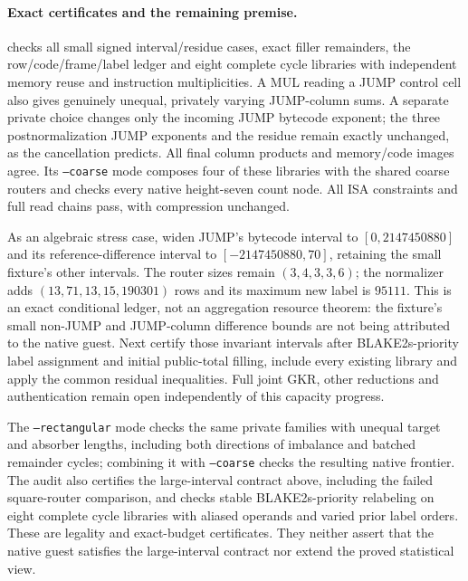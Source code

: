 \paragraph{Exact certificates and the remaining premise.}  checks all small signed interval/residue cases, exact filler remainders, the row/code/frame/label ledger and eight complete cycle libraries with independent memory reuse and instruction multiplicities. A MUL reading a JUMP control cell also gives genuinely unequal, privately varying JUMP-column sums. A separate private choice changes only the incoming JUMP bytecode exponent; the three postnormalization JUMP exponents and the residue remain exactly unchanged, as the cancellation predicts. All final column products and memory/code images agree. Its \texttt{--coarse} mode composes four of these libraries with the shared coarse routers and checks every native height-seven count node. All ISA constraints and full read chains pass, with compression unchanged.

As an algebraic stress case, widen JUMP's bytecode interval to $[0,2147450880]$ and its reference-difference interval to $[-2147450880,70]$, retaining the small fixture's other intervals. The router sizes remain $(3,4,3,3,6)$; the normalizer adds $(13,71,13,15,190301)$ rows and its maximum new label is $95111$. This is an exact conditional ledger, not an aggregation resource theorem: the fixture's small non-JUMP and JUMP-column difference bounds are not being attributed to the native guest. Next certify those invariant intervals after BLAKE2s-priority label assignment and initial public-total filling, include every existing library and apply the common residual inequalities. Full joint GKR, other reductions and authentication remain open independently of this capacity progress.

The \texttt{--rectangular} mode checks the same private families with unequal target and absorber lengths, including both directions of imbalance and batched remainder cycles; combining it with \texttt{--coarse} checks the resulting native frontier. The audit also certifies the large-interval contract above, including the failed square-router comparison, and checks stable BLAKE2s-priority relabeling on eight complete cycle libraries with aliased operands and varied prior label orders. These are legality and exact-budget certificates. They neither assert that the native guest satisfies the large-interval contract nor extend the proved statistical view.
